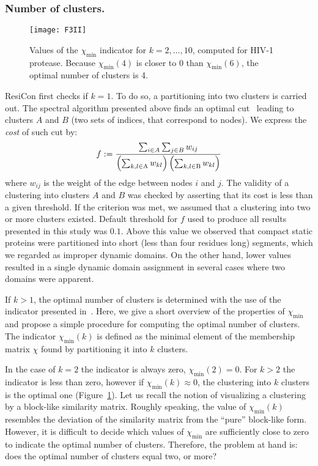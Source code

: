 \subsubsection*{Number of clusters.}
\begin{figure}
\centering
\texttt{[image: F3II]}
\caption{
Values of the $\chi_{\text{min}}$ indicator for $k=2,\ldots,10$, computed for HIV-1 protease.
Because $\chi_{\text{min}}(4)$ is closer to 0 than $\chi_{\text{min}}(6)$, the optimal number of clusters is 4.
}
\label{minChiList}
\end{figure}
ResiCon first checks if $k=1$.
To do so, a partitioning into two clusters is carried out.
The spectral algorithm presented above finds an optimal cut~\cite{weber2004perron} leading to clusters $A$ and $B$ (two sets of indices, that correspond to nodes).
We express the \emph{cost} of such cut by:
\begin{displaymath}
f :=  \frac{\sum_{i \in A}\sum_{j \in B} w_{ij}}{\left ( \sum_{k,l \in \text{A}} w_{kl} \right ) \left ( \sum_{k,l \in \text{B}} w_{kl}   \right )} \\
\end{displaymath}
where $w_{ij}$ is the weight of the edge between nodes $i$ and $j$.
The validity of a clustering into clusters $A$ and $B$ was checked by asserting that its cost is less than a given threshold.
If the criterion was met, we assumed that a clustering into two or more clusters existed.
Default threshold for $f$ used to produce all results presented in this study was $0.1$. 
Above this value we observed that compact static proteins were partitioned into short (less than four residues long) segments, which we regarded as improper dynamic domains.
On the other hand, lower values resulted in a single dynamic domain assignment in several cases where two domains were apparent.

If $k>1$, the optimal number of clusters is determined with the use of the indicator presented in~\cite{weber2004perron}.
Here, we give a short overview of the properties of $\chi_{\text{min}}$ and propose a simple procedure for computing the optimal number of clusters.
The indicator $\chi_{\text{min}}(k)$ is defined as the minimal element of the membership matrix $\chi$ found by partitioning it into $k$ clusters.

In the case of $k=2$ the indicator is always zero, $\chi_\text{min}(2)=0$.
For $k>2$ the indicator is less than zero, however if $\chi_\text{min}(k)\approx 0$, the clustering into $k$ clusters is the optimal one (Figure~\ref{minChiList}).
Let us recall the notion of visualizing a clustering by a block-like similarity matrix.
Roughly speaking, the value of $\chi_\text{min}(k)$ resembles the deviation of the similarity matrix from the ``pure'' block-like form.
However, it is difficult to decide which values of $\chi_\text{min}$ are sufficiently close to zero to indicate the optimal number of clusters.
Therefore, the problem at hand is: does the optimal number of clusters equal two, or more?

